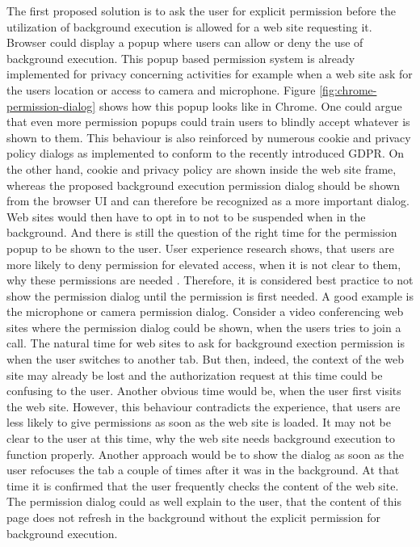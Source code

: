 \documentclass[
	ruledheaders=section,%
	class=report,%
	thesis={type=bachelor},%
	accentcolor=9c,%
	custommargins=true,%
	marginpar=false,%
	parskip=half-,%
	fontsize=11pt,%
]{tudapub}
\begin{document}
  The first proposed solution is to ask the user for explicit permission before the utilization of background execution is allowed for a web site requesting it. Browser could display a popup where users can allow or deny the use of background execution. This popup based permission system is already implemented for privacy concerning activities for example when a web site ask for the users location or access to camera and microphone. Figure \ref{fig:chrome-permission-dialog} shows how this popup looks like in Chrome. One could argue that even more permission popups could train users to blindly accept whatever is shown to them. This behaviour is also reinforced by numerous cookie and privacy policy dialogs as implemented to conform to the recently introduced GDPR. On the other hand, cookie and privacy policy are shown inside the web site frame, whereas the proposed background execution permission dialog should be shown from the browser UI and can therefore be recognized as a more important dialog. Web sites would then have to opt in to not to be suspended when in the background. And there is still the question of the right time for the permission popup to be shown to the user. User experience research shows, that users are more likely to deny permission for elevated access, when it is not clear to them, why these permissions are needed \cite{bonne2017exploring}. Therefore, it is considered best practice to not show the permission dialog until the permission is first needed. A good example is the microphone or camera permission dialog. Consider a video conferencing web sites where the permission dialog could be shown, when the users tries to join a call. The natural time for web sites to ask for background exection permission is when the user switches to another tab. But then, indeed, the context of the web site may already be lost and the authorization request at this time could be confusing to the user. Another obvious time would be, when the user first visits the web site. However, this behaviour contradicts the experience, that users are less likely to give permissions as soon as the web site is loaded. It may not be clear to the user at this time, why the web site needs background execution to function properly. Another approach would be to show the dialog as soon as the user refocuses the tab a couple of times after it was in the background. At that time it is confirmed that the user frequently checks the content of the web site. The permission dialog could as well explain to the user, that the content of this page does not refresh in the background without the explicit permission for background execution.
\end{document}
